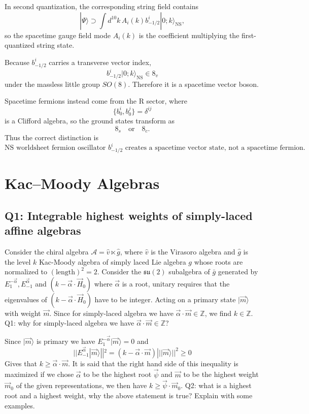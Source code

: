 \documentclass[
  10pt,
  a4paper,
  openany]{book}
\begin{document}
In second quantization, the corresponding string field contains \[
|\Psi\rangle
\supset
\int d^{10}k\,
A_i(k)b_{-1/2}^i|0;k\rangle_{\text{NS}},
\] so the spacetime gauge field mode \(A_i(k)\) is the coefficient
multiplying the first-quantized string state.

Because \(b_{-1/2}^i\) carries a transverse vector index, \[
b_{-1/2}^i|0;k\rangle_{\text{NS}}
\in
8_v
\] under the massless little group \(SO(8)\). Therefore it is a
spacetime vector boson.

Spacetime fermions instead come from the R sector, where \[
\{b_0^i,b_0^j\}
=
\delta^{ij}
\] is a Clifford algebra, so the ground states transform as \[
8_s
\quad
\text{or}
\quad
8_c.
\] Thus the correct distinction is \[
\boxed{
\text{NS worldsheet fermion oscillator } b_{-1/2}^i
\text{ creates a spacetime vector state, not a spacetime fermion.}
}
\]

\chapter{Kac--Moody Algebras}\label{kacmoody-algebras-1}

\section{Q1: Integrable highest weights of simply-laced affine
algebras}\label{q1-integrable-highest-weights-of-simply-laced-affine-algebras}

Consider the chiral algebra \(\mathcal{A}=\hat{v}\ltimes\hat{g}\), where
\(\hat{v}\) is the Virasoro algebra and \(\hat{g}\) is the level \(k\)
Kac-Moody algebra of simply laced Lie algebra \(g\) whose roots are
normalized to \((\text{length})^2=2\). Consider the \(\mathfrak{su}(2)\)
subalgebra of \(\bar{g}\) generated by
\(E_{1}^{-\vec{\alpha}},E_{-1}^{\vec{\alpha}}\) and
\((k-\vec{\alpha}\cdot \vec{H}_{0})\) where \(\vec{\alpha}\) is a root,
unitary requires that the eigenvalues of
\((k-\vec{\alpha}\cdot \vec{H}_{0})\) have to be integer. Acting on a
primary state \(|\vec{m}\rangle\) with weight \(\vec{m}\). Since for
simply-laced algebra we have
\(\vec{\alpha}\cdot \vec{m}\in \mathbb{Z}\), we find
\(k\in \mathbb{Z}\). Q1: why for simply-laced algebra we have
\(\vec{\alpha}\cdot \vec{m}\in \mathbb{Z}\)?

Since \(|\vec{m}\rangle\) is primary we have
\(E_{1}^{-\vec{\alpha}}|\vec{m}\rangle=0\) and \[
||E_{-1}^{\vec{\alpha}}|\vec{m}\rangle||^2=(k-\vec{\alpha}\cdot \vec{m})|||\vec{m}\rangle||^2\geq 0
\] Gives that \(k\geq \vec{\alpha}\cdot \vec{m}\). It is said that the
right hand side of this inequality is maximized if we chose
\(\vec{\alpha}\) to be the highest root \(\vec{\psi}\) and \(\vec{m}\)
to be the highest weight \(\vec{m}_{0}\) of the given representations,
we then have \(k\geq \vec{\psi}\cdot \vec{m}_{0}\). Q2: what is a
highest root and a highest weight, why the above statement is true?
Explain with some examples.
\end{document}
